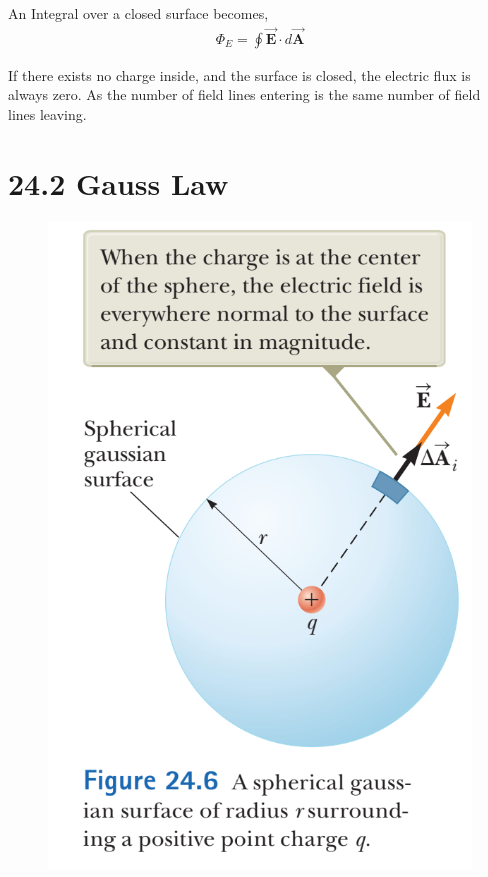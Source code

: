 \documentclass[12pt, titlepage, oneside]{article}
\let\oldvec\vec
\renewcommand{\vec}[1]{\oldvec{\bm{#1}}}
\begin{document}
\noindent An Integral over a closed surface becomes,
\begin{align*}
\Phi_E = \oint \vec{E}\cdot d\vec{A}
\end{align*}

If there exists no charge inside, and the surface is closed, the electric flux is always zero. As the number of field lines entering is the same number of field lines leaving.
\newpage
\section*{24.2 Gauss Law}

\begin{figure}
	\begin{center}
		\includegraphics[scale=0.5]{3.PNG}
	\end{center}
\end{figure}
\end{document}
